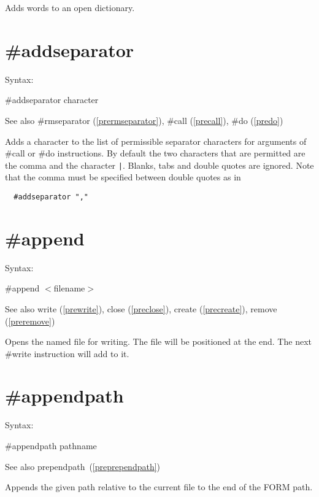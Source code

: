 \noindent Adds words to an open dictionary.

 
\section{\#addseparator}
\label{preaddseparator}

\noindent Syntax:

\#addseparator character
 
\noindent See also \#rmseparator (\ref{prermseparator}),
            \#call (\ref{precall}), \#do (\ref{predo})

\noindent Adds a character to the list of permissible 
separator characters for arguments of \#call or \#do instructions. By 
default the two characters that are permitted are the comma and the 
character \verb:|:. Blanks, tabs and double quotes are ignored. Note that 
the comma must be specified between double quotes as in
\begin{verbatim}
  #addseparator ","
\end{verbatim}


 
\section{\#append}
\label{preappend}

\noindent Syntax:

\#append $<$filename$>$
 
\noindent See also write (\ref{prewrite}),
            close (\ref{preclose}), create (\ref{precreate}),
            remove (\ref{preremove})

\noindent Opens the named file for writing. The file will 
be positioned at the end. The next \#write instruction will 
add to it.

 
\section{\#appendpath}
\label{preappendpath}

\noindent Syntax:

\#appendpath pathname

\noindent See also prependpath~(\ref{preprependpath})

\noindent Appends the given path relative to the current file to the end of
the FORM path.

